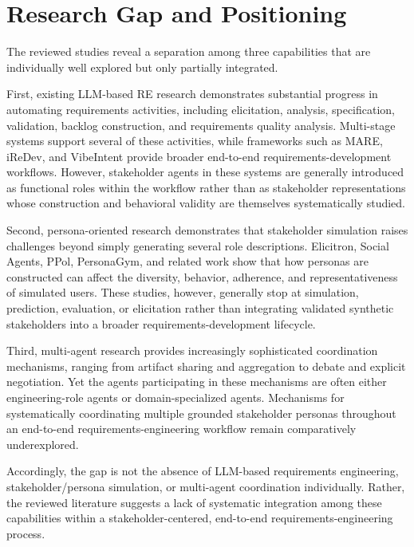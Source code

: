 \section{Research Gap and Positioning}
\label{sec:rw-gap}

The reviewed studies reveal a separation among three capabilities that are individually well explored but only partially integrated.

First, existing LLM-based RE research demonstrates substantial progress in automating requirements activities, including elicitation, analysis, specification, validation, backlog construction, and requirements quality analysis. Multi-stage systems support several of these activities, while frameworks such as MARE, iReDev, and VibeIntent provide broader end-to-end requirements-development workflows. However, stakeholder agents in these systems are generally introduced as functional roles within the workflow rather than as stakeholder representations whose construction and behavioral validity are themselves systematically studied.

Second, persona-oriented research demonstrates that stakeholder simulation raises challenges beyond simply generating several role descriptions. Elicitron, Social Agents, PPol, PersonaGym, and related work show that how personas are constructed can affect the diversity, behavior, adherence, and representativeness of simulated users. These studies, however, generally stop at simulation, prediction, evaluation, or elicitation rather than integrating validated synthetic stakeholders into a broader requirements-development lifecycle.

Third, multi-agent research provides increasingly sophisticated coordination mechanisms, ranging from artifact sharing and aggregation to debate and explicit negotiation. Yet the agents participating in these mechanisms are often either engineering-role agents or domain-specialized agents. Mechanisms for systematically coordinating multiple grounded stakeholder personas throughout an end-to-end requirements-engineering workflow remain comparatively underexplored.

Accordingly, the gap is not the absence of LLM-based requirements engineering, stakeholder/persona simulation, or multi-agent coordination individually. Rather, the reviewed literature suggests a lack of systematic integration among these capabilities within a stakeholder-centered, end-to-end requirements-engineering process.

